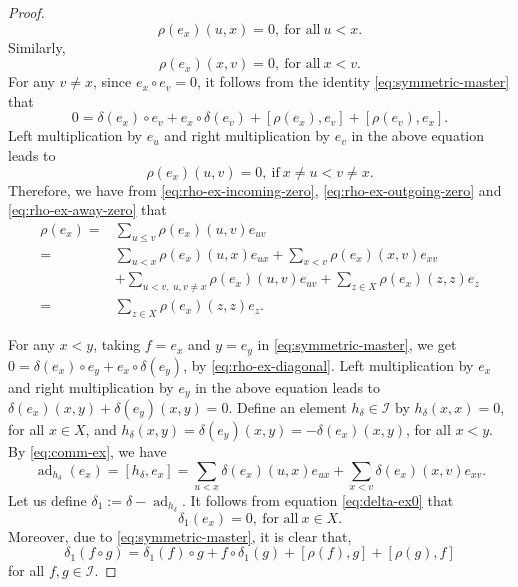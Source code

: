 \documentclass[reqno]{amsart}
\numberwithin{equation}{section}
\theoremstyle{plain}
\theoremstyle{definition}
\newcommand{\I}{\mathcal I}
\newcommand{\ad}{\operatorname{ad}}
\begin{document}
\begin{proof}
\begin{equation}
\rho(e_x)(u,x)=0,~\text{for~all}~u<x.
\end{equation}
Similarly,
\begin{equation}\label{eq:rho-ex-outgoing-zero}
\rho(e_x)(x,v)=0,~\text{for~all}~x<v.
\end{equation}
For any $v\neq x$, since $e_x\circ e_v=0$, it follows from the identity \eqref{eq:symmetric-master} that
$$
0=\delta(e_x)\circ e_v+e_x\circ\delta(e_v)+[\rho(e_x),e_v]+[\rho(e_v),e_x].
$$
Left multiplication by $e_u$ and right multiplication by $e_v$ in the above equation leads to
\begin{equation}\label{eq:rho-ex-away-zero}
\rho(e_x)(u,v)=0,~\text{if}~x\neq u<v\neq x.
\end{equation}
Therefore, we have from \eqref{eq:rho-ex-incoming-zero}, \eqref{eq:rho-ex-outgoing-zero} and \eqref{eq:rho-ex-away-zero} that
\begin{align}
\rho(e_x)=&\sum_{u\leq v}\rho(e_x)(u,v)e_{uv}\nonumber\\
=&\sum_{u<x}\rho(e_x)(u,x)e_{ux}+\sum_{x<v}\rho(e_x)(x,v)e_{xv}\nonumber\\
&+\sum_{u<v,~u,v\neq x}\rho(e_x)(u,v)e_{uv}+\sum_{z\in X}\rho(e_x)(z,z)e_{z}\nonumber\\
=&\sum_{z\in X}\rho(e_x)(z,z)e_{z}.\label{eq:rho-ex-diagonal}
\end{align}

For any $x<y$, taking $f=e_x$ and $y=e_y$ in \eqref{eq:symmetric-master}, we get
$0=\delta(e_x)\circ e_y+e_x\circ\delta(e_y)$, by \eqref{eq:rho-ex-diagonal}.
Left multiplication by $e_x$ and right multiplication by $e_y$ in the above equation leads to
$\delta(e_x)(x,y)+\delta(e_y)(x,y)=0$.
Define an element $h_\delta\in\I$ by $h_\delta(x,x)=0$, for all $x\in X$,
and $h_\delta(x,y)=\delta(e_y)(x,y)=-\delta(e_x)(x,y)$, for all $x<y$. By \eqref{eq:comm-ex}, we have
\[
\ad_{h_\delta}(e_x)=[h_\delta, e_x]=\sum_{u<x}\delta(e_x)(u,x)e_{ux}
+\sum_{x<v}\delta(e_x)(x,v)e_{xv}.
\]
Let us define $\delta_1:=\delta-\ad_{h_\delta}$. It follows from equation \eqref{eq:delta-ex0} that
\begin{equation}\label{eq:delta1-ex-zero}
\delta_1(e_x)=0,~\text{for~all}~x\in X.
\end{equation}
Moreover, due to \eqref{eq:symmetric-master}, it is clear that,
\begin{equation}\label{eq:symmetric-master-delta1}
\delta_1(f\circ g)=\delta_1(f)\circ g+f\circ\delta_1(g)+[\rho(f),g]+[\rho(g),f]
\end{equation}
for all $f,g\in \I$.


\end{proof}
\end{document}
